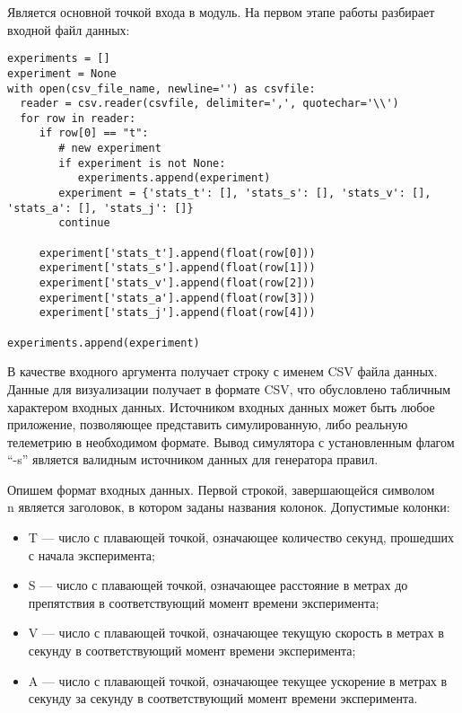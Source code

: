 Является основной точкой входа в модуль. На первом этапе работы разбирает входной файл данных:

\begin{lstlisting}[style=pythonstyle,caption={  }, label=lst:func:1]
experiments = []
experiment = None
with open(csv_file_name, newline='') as csvfile:
  reader = csv.reader(csvfile, delimiter=',', quotechar='\\')
  for row in reader:
     if row[0] == "t":
        # new experiment
        if experiment is not None:
           experiments.append(experiment)
        experiment = {'stats_t': [], 'stats_s': [], 'stats_v': [], 'stats_a': [], 'stats_j': []}
        continue

     experiment['stats_t'].append(float(row[0]))
     experiment['stats_s'].append(float(row[1]))
     experiment['stats_v'].append(float(row[2]))
     experiment['stats_a'].append(float(row[3]))
     experiment['stats_j'].append(float(row[4]))

experiments.append(experiment)
\end{lstlisting}


В качестве входного аргумента получает строку с именем CSV файла данных. Данные для визуализации получает в формате CSV, что обусловлено табличным характером входных данных. Источником входных данных может быть любое приложение, позволяющее представить симулированную, либо реальную телеметрию в необходимом формате. Вывод симулятора с установленным флагом “-s” является валидным источником данных для генератора правил.

Опишем формат входных данных. Первой строкой, завершающейся символом \\n является заголовок, в котором заданы названия колонок. Допустимые колонки:

\begin{itemize}
	\item T — число с плавающей точкой, означающее количество секунд, прошедших с начала эксперимента;
	\item S — число с плавающей точкой, означающее расстояние в метрах до препятствия в соответствующий момент времени эксперимента;
	\item V — число с плавающей точкой, означающее текущую скорость в метрах в секунду в соответствующий момент времени эксперимента;
	\item A — число с плавающей точкой, означающее текущее ускорение в метрах в секунду за секунду в соответствующий момент времени эксперимента.
\end{itemize}

